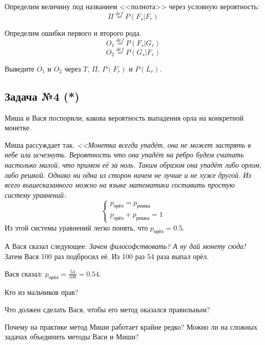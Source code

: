 \documentclass[english,russian,12pt]{article}
\begin{document}
Определим величину под названием <<полнота>> через условную вероятность:
\begin{equation}
\Pi \stackrel{def}{=} P(F_s | F_r)
\end{equation}

Определим ошибки первого и второго рода.
\begin{equation}
O_1 \stackrel{def}{=} P(F_s | G_r)
\end{equation}
\begin{equation}
O_2 \stackrel{def}{=} P(G_s | F_r)
\end{equation}

Выведите $O_1$ и $O_2$ через $T$, $\Pi$, $P(F_r)$ и $P(L_r)$.

\newpage
\subsection*{Задача №4 (*)}
Миша и Вася поспорили, какова вероятность выпадения орла на конкретной монетке. 

Миша рассуждает так. \textit{<<Монетка всегда упадёт, она не может застрять в небе или исчезнуть. Вероятность что она упадёт на ребро будем считать настолько малой, что примем её за ноль. Таким образом она упадёт либо орлом, либо решкой. Однако ни одна из сторон ничем не лучше и не хуже другой. Из всего вышесказанного можно на языке математики составить простую систему уравнений:}
\begin{equation}
\left\{
\begin{array}{l}
p_{\text{орёл}} = p_{\text{решка}} \\
p_{\text{орёл}} + p_{\text{решка}} = 1
\end{array}
\right.
\end{equation}
Из этой системы уравнений легко понять, что $p_{\text{орёл}}=0.5$.

А Вася сказал следующее: \textit{Зачем философствовать? А ну дай монету сюда!} Затем Вася 100 раз подбросил её. Из 100 раз 54 раза выпал орёл. 

Вася сказал:  $p_{\text{орёл}}=\frac{54}{100}=0.54$.

Кто из мальчиков прав? 

Что должен сделать Вася, чтобы его метод оказался правильным? 

Почему на практике метод Миши работает крайне редко? Можно ли на сложных задачах объединить методы Васи и Миши?
\end{document}
